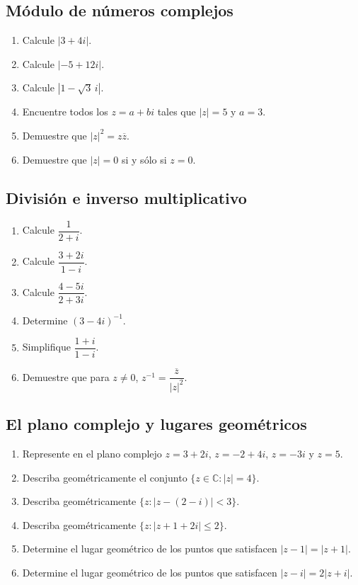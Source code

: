 \documentclass[12pt]{article}
\begin{document}
\subsection*{Módulo de números complejos}
\begin{enumerate}
\item Calcule $|3+4i|$.
\item Calcule $|-5+12i|$.
\item Calcule $|1-\sqrt3\,i|$.
\item Encuentre todos los $z=a+bi$ tales que $|z|=5$ y $a=3$.
\item Demuestre que $|z|^2=z\overline z$.
\item Demuestre que $|z|=0$ si y sólo si $z=0$.
\end{enumerate}

\subsection*{División e inverso multiplicativo}
\begin{enumerate}
\item Calcule $\dfrac{1}{2+i}$.
\item Calcule $\dfrac{3+2i}{1-i}$.
\item Calcule $\dfrac{4-5i}{2+3i}$.
\item Determine $(3-4i)^{-1}$.
\item Simplifique $\dfrac{1+i}{1-i}$.
\item Demuestre que para $z\neq0$, $z^{-1}=\dfrac{\overline z}{|z|^2}$.
\end{enumerate}

\subsection*{El plano complejo y lugares geométricos}
\begin{enumerate}
\item Represente en el plano complejo $z=3+2i$, $z=-2+4i$, $z=-3i$ y $z=5$.
\item Describa geométricamente el conjunto $\{z\in\mathbb{C}: |z|=4\}$.
\item Describa geométricamente $\{z: |z-(2-i)|<3\}$.
\item Describa geométricamente $\{z: |z+1+2i|\le 2\}$.
\item Determine el lugar geométrico de los puntos que satisfacen $|z-1|=|z+1|$.
\item Determine el lugar geométrico de los puntos que satisfacen $|z-i|=2|z+i|$.
\end{enumerate}
\end{document}
